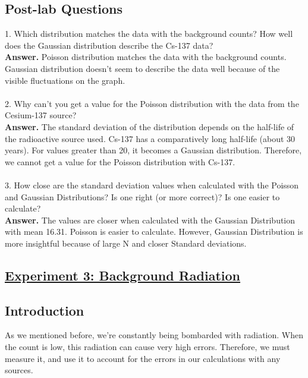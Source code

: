 \documentclass[twocolumn]{article}
\begin{document}
\subsection*{Post-lab Questions}
1. Which distribution matches the data with the background counts? How well does the Gaussian distribution describe the Cs-137 data?\\
\textbf{Answer.} Poisson distribution matches the data with the background counts. Gaussian distribution doesn't seem to describe the data well because of the visible fluctuations on the graph. \\
\\
2. Why can’t you get a value for the Poisson distribution with the data from the Cesium-137 source?\\
\textbf{Answer.} The standard deviation of the distribution depends on the half-life of the radioactive source used. Cs-137 has a comparatively long half-life (about 30 years). For values greater than 20, it becomes a Gaussian distribution. Therefore, we cannot get a value for the Poisson distribution with Cs-137.\\
\\
3. How close are the standard deviation values when calculated with the Poisson and Gaussian Distributions? Is one right (or more correct)? Is one easier to calculate?\\
\textbf{Answer.} The values are closer when calculated with the Gaussian Distribution with mean 16.31. Poisson is easier to calculate. However, Gaussian Distribution is more insightful because of large N and closer Standard deviations.\\ 









$$$$


\begin{center}\section*{\underline{Experiment 3: Background Radiation}}\end{center}
\subsection*{Introduction}
As we mentioned before, we're constantly being bombarded with radiation. When the count is low, this radiation can cause very high errors. Therefore, we must measure it, and use it to account for the errors in our calculations with any sources.
\end{document}
